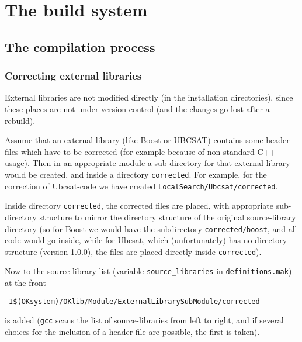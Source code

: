 \documentclass{book}
\newcommand{\filename}[1]{\texttt{#1}}
\newcommand{\name}[1]{\texttt{#1}}
\begin{document}
\part{The build system}
\label{par:Build}




\chapter{The compilation process}
\label{cha:BuildCompilation}

\section{Correcting external libraries}
\label{sec:Correctingexternallibraries}

External libraries are not modified directly (in the installation directories), since these places are not under version control (and the changes go lost after a rebuild).

Assume that an external library (like Boost or UBCSAT) contains some header files which have to be corrected (for example because of non-standard C++ usage). Then in an appropriate module a sub-directory for that external library would be created, and inside a directory \filename{corrected}. For example, for the correction of Ubcsat-code we have created \filename{LocalSearch/Ubcsat/corrected}.

Inside directory \filename{corrected}, the corrected files are placed, with appropriate sub-directory structure to mirror the directory structure of the original source-library directory (so for Boost we would have the subdirectory \filename{corrected/boost}, and all code would go inside, while for Ubcsat, which (unfortunately) has no directory structure (version 1.0.0), the files are placed directly inside \filename{corrected}).

Now to the source-library list (variable \name{source\_libraries} in \filename{definitions.mak}) at the front 
\begin{verbatim}
-I$(OKsystem)/OKlib/Module/ExternalLibrarySubModule/corrected
\end{verbatim} is added (\name{gcc} scans the list of source-libraries from left to right, and if several choices for the inclusion of a header file are possible, the first is taken).
\end{document}
